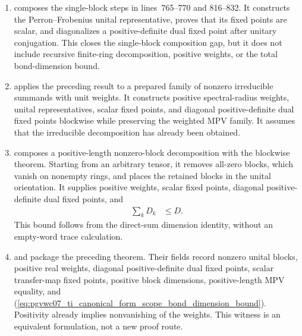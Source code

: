 \documentclass{article}
\begin{document}
\begin{enumerate}
    \item
          composes the single-block steps in lines~765--770 and 816--832. It
          constructs the Perron--Frobenius unital representative, proves that
          its fixed points are scalar, and diagonalizes a positive-definite
          dual fixed point after unitary conjugation. This closes the
          single-block composition gap, but it does not include recursive
          finite-ring decomposition, positive weights, or the total
          bond-dimension bound.

    \item
           applies
          the preceding result to a prepared family of nonzero irreducible
          summands with unit weights. It constructs positive spectral-radius
          weights, unital representatives, scalar fixed points, and diagonal
          positive-definite dual fixed points blockwise while preserving the
          weighted MPV family. It assumes that the irreducible decomposition
          has already been obtained.

    \item
          composes a positive-length nonzero-block decomposition with the
          blockwise theorem. Starting from an arbitrary tensor, it removes
          all-zero blocks, which vanish on nonempty rings, and places the
          retained blocks in the unital orientation. It supplies positive
          weights, scalar fixed points, diagonal positive-definite dual fixed
          points, and
          \begin{align}
              \sum_k D_k
                  &\leq D.
              \label{eq:pgvwc07_ti_canonical_form_scope_bond_dimension_bound}
          \end{align}
          This bound follows from the direct-sum dimension identity, without
          an empty-word trace calculation.

    \item
           and
           package the
          preceding theorem. Their fields record nonzero unital blocks,
          positive real weights, diagonal positive-definite dual fixed points,
          scalar transfer-map fixed points, positive block dimensions,
          positive-length MPV equality, and
          (\ref{eq:pgvwc07_ti_canonical_form_scope_bond_dimension_bound}).
          Positivity already implies nonvanishing of the weights. This witness
          is an equivalent formulation, not a new proof route.


\end{enumerate}
\end{document}
